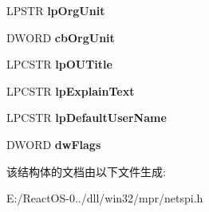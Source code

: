 \begin{DoxyCompactItemize}
L\+P\+S\+TR {\bfseries lp\+Org\+Unit}
\item 
\mbox{\label{struct_a_u_t_h_d_l_g_s_t_r_u_c_t_a_a80b358b87a2a7b3f896ee22e276b30a2}} 
D\+W\+O\+RD {\bfseries cb\+Org\+Unit}
\item 
\mbox{\label{struct_a_u_t_h_d_l_g_s_t_r_u_c_t_a_ac5a3571ea141f55291c6058fbe6e02ca}} 
L\+P\+C\+S\+TR {\bfseries lp\+O\+U\+Title}
\item 
\mbox{\label{struct_a_u_t_h_d_l_g_s_t_r_u_c_t_a_a4ea98c2c5e26bde4090820c290258921}} 
L\+P\+C\+S\+TR {\bfseries lp\+Explain\+Text}
\item 
\mbox{\label{struct_a_u_t_h_d_l_g_s_t_r_u_c_t_a_a401314f0c5acb12cd1b8cb89446cb6ea}} 
L\+P\+C\+S\+TR {\bfseries lp\+Default\+User\+Name}
\item 
\mbox{\label{struct_a_u_t_h_d_l_g_s_t_r_u_c_t_a_ab6a8e2e8b6e07e0a2e66f8c8f9fa06e0}} 
D\+W\+O\+RD {\bfseries dw\+Flags}
\end{DoxyCompactItemize}


该结构体的文档由以下文件生成\+:\begin{DoxyCompactItemize}
\item 
E\+:/\+React\+O\+S-\/0../dll/win32/mpr/netspi.\+h\end{DoxyCompactItemize}
